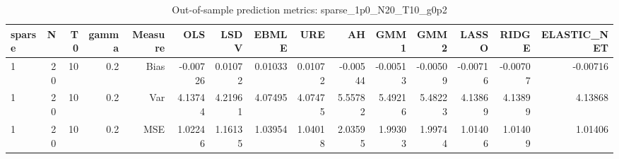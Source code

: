 \begin{table}[!htbp]\centering
\caption{Out-of-sample prediction metrics: sparse_1p0_N20_T10_g0p2}
\label{tab:table3_sparse_1p0_N20_T10_g0p2}
\begin{tabular}{lrrrrrrrrrrrrrr}
\hline
sparse & N & T0 & gamma & Measure & OLS & LSDV & EBMLE & URE & AH & GMM1 & GMM2 & LASSO & RIDGE & ELASTIC_NET \\
\hline
1 & 20 & 10 & 0.2 & Bias & -0.00726 & 0.01072 & 0.01033 & 0.01072 & -0.00544 & -0.00513 & -0.00509 & -0.00716 & -0.00707 & -0.00716 \\
1 & 20 & 10 & 0.2 & Var & 4.13744 & 4.21961 & 4.07495 & 4.07475 & 5.55782 & 5.49216 & 5.48223 & 4.13869 & 4.13899 & 4.13868 \\
1 & 20 & 10 & 0.2 & MSE & 1.02246 & 1.16135 & 1.03954 & 1.04018 & 2.03595 & 1.99303 & 1.99744 & 1.01406 & 1.01409 & 1.01406 \\
\hline
\end{tabular}
\end{table}

